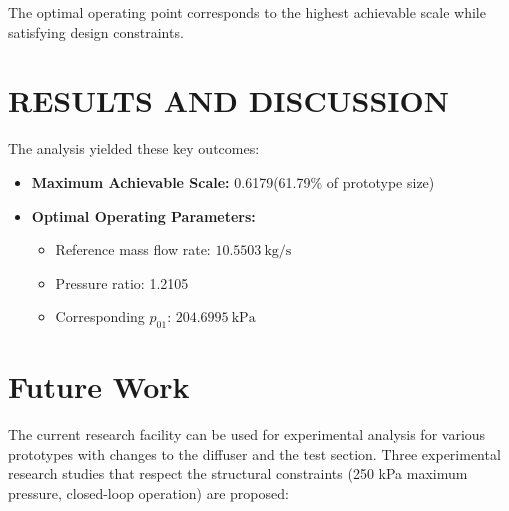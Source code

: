 \documentclass[12pt,a4paper]{article}
\begin{document}
	The optimal operating point corresponds to the highest achievable scale while satisfying design constraints.
	
	\section*{RESULTS AND DISCUSSION}
	The analysis yielded these key outcomes:
	\begin{itemize}
		\item \textbf{Maximum Achievable Scale:} 0.6179(61.79\% of prototype size)
		\item \textbf{Optimal Operating Parameters:}
		\begin{itemize}
			\item Reference mass flow rate: $ 10.5503 \ \mathrm{kg/s}$
			\item Pressure ratio: 1.2105
			\item Corresponding $p_{01}$: $204.6995 \ \mathrm{kPa}$
		\end{itemize}
		
	\end{itemize}
	
\section*{Future Work}
The current research facility can be used for experimental analysis for various prototypes with changes to the diffuser and the test section. Three experimental research studies that respect the structural constraints (250 kPa maximum pressure, closed-loop operation) are proposed:
\end{document}
